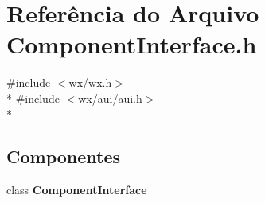 \section{Referência do Arquivo Component\+Interface.\+h}
\label{_component_interface_8h}
{\ttfamily \#include $<$wx/wx.\+h$>$}\\*
{\ttfamily \#include $<$wx/aui/aui.\+h$>$}\\*
\subsection*{Componentes}
\begin{DoxyCompactItemize}
\item 
class {\bf Component\+Interface}
\end{DoxyCompactItemize}
